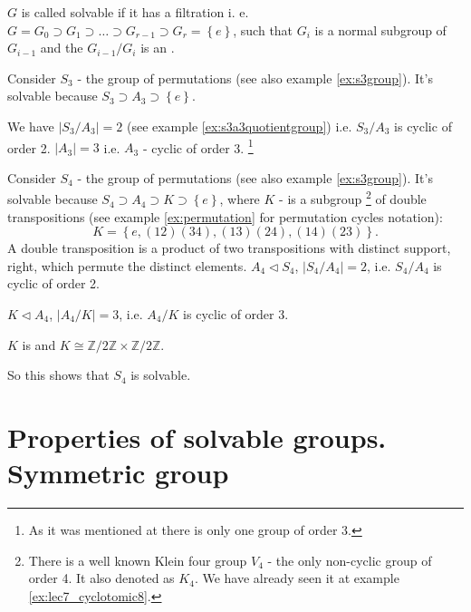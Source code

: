 \begin{definition}
  $G$ is called solvable if it has a filtration 
  i. e. $G = G_0 \supset G_1 \supset \dots \supset G_{r-1} \supset G_r
  = \left\{e\right\}$, such that $G_i$ is a normal subgroup of
  $G_{i-1}$ and the  $G_{i-1}/G_i$ is
  an .
  \label{def:solvablegroup}
\end{definition}

\begin{example}
  Consider $S_3$ - the group of permutations (see also example
  \ref{ex:s3group}). It's solvable because 
  $S_3 \supset A_3 \supset \left\{e\right\}$.

  We have $\left|S_3/A_3\right| = 2$ (see example
  \ref{ex:s3a3quotientgroup}) i.e. $S_3/A_3$ is cyclic of order 
  2. $\left|A_3\right| = 3$ i.e. $A_3$ - cyclic of order 3.
  \footnote{
    As it was mentioned at \cite{wiki:finitegroup} there is only one
    group of order 3.
  }
  \label{ex:lec8_s3}
\end{example}

\begin{example}
  Consider $S_4$ - the group of permutations (see also example
  \ref{ex:s3group}). It's solvable because 
  $S_4 \supset A_4 \supset K \supset \left\{e\right\}$, where $K$ -
  is a subgroup
  \footnote{
    There is a well known Klein four group $V_4$ \cite{wiki:klein4group} -
    the only non-cyclic group of order 4. It also denoted as $K_4$. We
    have already seen it at example \ref{ex:lec7_cyclotomic8}.
  }
  of double transpositions
  (see example
  \ref{ex:permutation} for permutation cycles notation):
  \[
  K = \left\{
  e, (12)(34), (13)(24), (14)(23)
  \right\}.
  \]
  A double transposition is a product of two transpositions with
  distinct support, right, which permute the distinct elements.
  $A_4 \triangleleft S_4$, $\left|S_4/A_4\right| = 2$, i.e.
  $S_4/A_4$ is cyclic of order 2.

  $K \triangleleft A_4$, $\left|A_4/K\right| = 3$, i.e.
  $A_4/K$ is cyclic of order 3.

  $K$ is  and
  $K \cong \mathbb{Z}/2\mathbb{Z} \times \mathbb{Z}/2 \mathbb{Z}$.

  So this shows that $S_4$ is solvable.
  \label{ex:lec8_s4}
\end{example}

\section{Properties of solvable groups. Symmetric group}

